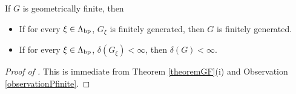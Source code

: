 \begin{corollary}
\label{corollaryGF}
If $G$ is geometrically finite, then
\begin{itemize}
\item[(i)] If for every $\xi\in\Lambda_{\mathrm{bp}}$, $G_\xi$ is finitely generated, then $G$ is finitely generated.
\item[(ii)] If for every $\xi\in\Lambda_{\mathrm{bp}}$, $\delta(G_\xi) < \infty$, then $\delta(G) < \infty$.
\end{itemize}
\end{corollary}
\begin{proof}[Proof of ]
This is immediate from Theorem \ref{theoremGF}(i) and Observation \ref{observationPfinite}.
\end{proof}
